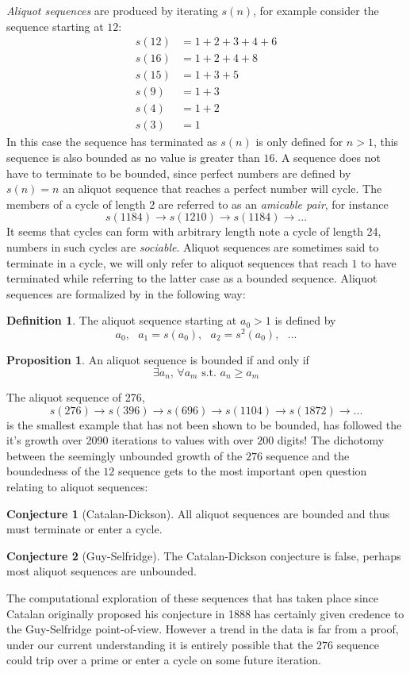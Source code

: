 \documentclass{article}
\theoremstyle{definition}
\newtheorem{definition}{Definition}[section]
\newtheorem{conjecture}{Conjecture}[section]
\newtheorem{proposition}{Proposition}[section]
\begin{document}
\textit{Aliquot sequences} are produced by iterating $s(n)$, for example consider the sequence starting at $12$:
\begin{align*}
    s(12) & = 1 + 2 + 3 + 4 + 6 \\
    s(16) & = 1 + 2 + 4 + 8     \\
    s(15) & = 1 + 3 + 5         \\
    s(9)  & = 1 + 3             \\
    s(4)  & = 1 + 2             \\
    s(3)  & = 1
\end{align*}
In this case the sequence has terminated as $s(n)$ is only defined for $n > 1$, this sequence is also bounded as no value is greater than $16$. A sequence does not have to terminate to be bounded, since perfect numbers are defined by $s(n) = n$ an aliquot sequence that reaches a perfect number will cycle. The members of a cycle of length $2$ are referred to as an \textit{amicable pair}, for instance
$$s(1184) \to s(1210) \to s(1184) \to ...$$
It seems that cycles can form with arbitrary length \cite{chum_guy_jacobson_mosunov_2018} note a cycle of length 24, numbers in such cycles are \textit{sociable}. Aliquot sequences are sometimes said to terminate in a cycle, we will only refer to aliquot sequences that reach $1$ to have terminated while referring to the latter case as a bounded sequence. Aliquot sequences are formalized by \cite{bosma_kane_2010} in the following way:
%
\begin{definition}
    The aliquot sequence starting at $a_0 > 1$ is defined by
    $$a_0,\text{ }a_1 = s(a_0),\text{ }a_2 = s^2(a_0),\text{ }...$$
\end{definition}
%
\begin{proposition}An aliquot sequence is bounded if and only if
    $$\exists a_n,\,\forall a_m \text{ s.t. }a_n \geq a_m$$
\end{proposition}
%
The aliquot sequence of 276,
$$s(276) \rightarrow s(396) \rightarrow s(696) \rightarrow s(1104) \rightarrow s(1872)  \rightarrow ...$$
is the smallest example that has not been shown to be bounded, \cite{zimmermann_2016} has followed the it's growth over 2090 iterations to values with over $200$ digits! The dichotomy between the seemingly unbounded growth of the $276$ sequence and the boundedness of the $12$ sequence gets to the most important open question relating to aliquot sequences:
%
\begin{conjecture}[Catalan-Dickson]
    All aliquot sequences are bounded and thus must terminate or enter a cycle. \cite{catalan_1888}
\end{conjecture}
%
\begin{conjecture}[Guy-Selfridge]
    The Catalan-Dickson conjecture is false, perhaps most aliquot sequences are unbounded. \cite{guy_selfridge_1975}
\end{conjecture}
%
The computational exploration of these sequences that has taken place since Catalan originally proposed his conjecture in 1888 has certainly given credence to the Guy-Selfridge point-of-view. However a trend in the data is far from a proof, under our current understanding it is entirely possible that the $276$ sequence could trip over a prime or enter a cycle on some future iteration.
%
\end{document}
